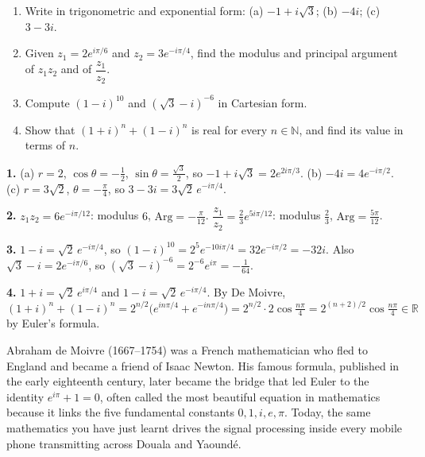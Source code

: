 \documentclass[11pt]{article}
\begin{document}
\begin{exercice}[Practice]
\begin{enumerate}
\item Write in trigonometric and exponential form: (a) $-1 + i\sqrt{3}$; (b) $-4i$; (c) $3 - 3i$.
\item Given $z_1 = 2e^{i\pi/6}$ and $z_2 = 3e^{-i\pi/4}$, find the modulus and principal argument of $z_1 z_2$ and of $\dfrac{z_1}{z_2}$.
\item Compute $(1 - i)^{10}$ and $(\sqrt{3} - i)^{-6}$ in Cartesian form.
\item Show that $(1 + i)^n + (1 - i)^n$ is real for every $n \in \mathbb{N}$, and find its value in terms of $n$.
\end{enumerate}
\end{exercice}

\begin{corrige}[Exercise 1]
\textbf{1.} (a) $r = 2$, $\cos\theta = -\frac12$, $\sin\theta = \frac{\sqrt3}{2}$, so $-1 + i\sqrt3 = 2e^{2i\pi/3}$. (b) $-4i = 4e^{-i\pi/2}$. (c) $r = 3\sqrt2$, $\theta = -\frac{\pi}{4}$, so $3 - 3i = 3\sqrt2\,e^{-i\pi/4}$.

\textbf{2.} $z_1z_2 = 6e^{-i\pi/12}$: modulus $6$, $\mathrm{Arg} = -\frac{\pi}{12}$. $\dfrac{z_1}{z_2} = \frac{2}{3}e^{5i\pi/12}$: modulus $\frac23$, $\mathrm{Arg} = \frac{5\pi}{12}$.

\textbf{3.} $1 - i = \sqrt2\,e^{-i\pi/4}$, so $(1-i)^{10} = 2^5 e^{-10i\pi/4} = 32e^{-i\pi/2} = -32i$. Also $\sqrt3 - i = 2e^{-i\pi/6}$, so $(\sqrt3 - i)^{-6} = 2^{-6}e^{i\pi} = -\frac{1}{64}$.

\textbf{4.} $1 + i = \sqrt2\,e^{i\pi/4}$ and $1 - i = \sqrt2\,e^{-i\pi/4}$. By De Moivre, $(1+i)^n + (1-i)^n = 2^{n/2}\bigl(e^{in\pi/4} + e^{-in\pi/4}\bigr) = 2^{n/2}\cdot 2\cos\frac{n\pi}{4} = 2^{(n+2)/2}\cos\frac{n\pi}{4} \in \mathbb{R}$ by Euler's formula.
\end{corrige}

\begin{savaistu}
Abraham de Moivre (1667--1754) was a French mathematician who fled to England and became a friend of Isaac Newton. His famous formula, published in the early eighteenth century, later became the bridge that led Euler to the identity $e^{i\pi} + 1 = 0$, often called the most beautiful equation in mathematics because it links the five fundamental constants $0, 1, i, e, \pi$. Today, the same mathematics you have just learnt drives the signal processing inside every mobile phone transmitting across Douala and Yaoundé.
\end{savaistu}
\end{document}
